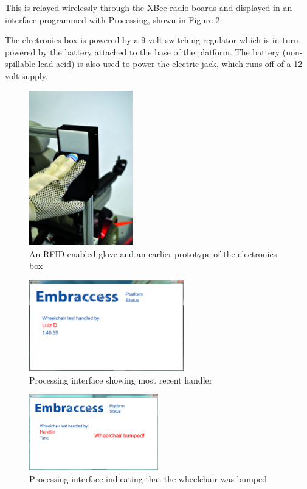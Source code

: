 This is relayed wirelessly through the XBee radio boards and displayed in an interface programmed with Processing, shown in Figure \ref{fig:processing}.

The electronics box is powered by a 9 volt switching regulator which is in turn powered by the battery attached to the base of the platform. The battery (non-spillable lead acid) is also used to power the electric jack, which runs off of a 12 volt supply.

\begin{figure}
\centering
 \includegraphics[width=0.4\textwidth]{images/glove}
\caption{An RFID-enabled glove and an earlier prototype of the electronics box}
\label{fig:glove}
\end{figure}

\begin{figure}
\centering
 \includegraphics[width=0.6\textwidth]{images/processing_use}
\caption{Processing interface showing most recent handler}
\label{fig:processing}
\end{figure}

\begin{figure}
\centering
 \includegraphics[width=0.5\textwidth]{images/processing_bump}
\caption{Processing interface indicating that the wheelchair was bumped}
\label{fig:processing_bump}
\end{figure}


